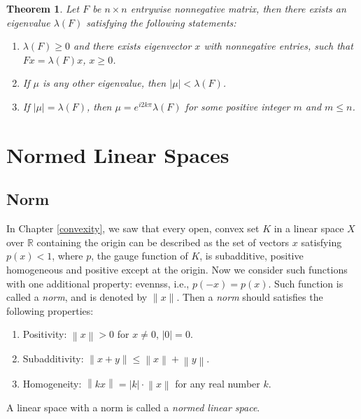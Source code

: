 \documentclass[11pt]{book}
\newtheorem{theorem}{Theorem}[chapter]
\theoremstyle{definition}
\numberwithin{equation}{chapter}
\begin{document}
\medskip

\begin{theorem}
Let $F$ be $n \times n$ entrywise nonnegative matrix, then there exists an eigenvalue $\lambda(F)$ satisfying the following statements:
\begin{enumerate}[label=(\alph*)]
    \item $\lambda(F) \geq 0$ and there exists eigenvector $x$ with nonnegative entries, such that $Fx = \lambda(F) x$, $x \geq 0$.
    
    \item If $\mu$ is any other eigenvalue, then $\left|\mu\right| < \lambda(F)$.
    
    \item If $\left|\mu\right| = \lambda(F)$, then $\mu = e^{i2k\pi} \lambda(F)$ for some positive integer $m$ and $m \leq n$.
\end{enumerate}
\end{theorem}



\chapter{Normed Linear Spaces}

\section{Norm}

In Chapter \ref{convexity}, we saw that every open, convex set $K$ in a linear space $X$ over $\mathbb{R}$ containing the origin can be described as the set of vectors $x$ satisfying $p(x) < 1$, where $p$, the gauge function of $K$, is subadditive, positive homogeneous and positive except at the origin. Now we consider such functions with one additional property: evennss, i.e., $p(-x) = p(x)$. Such function is called a {\em norm}, and is denoted by $\|x\|$. Then a {\em norm} should satisfies the following properties:
\begin{enumerate}[label=(\roman*)]
    \item Positivity: $\left\|x\right\| > 0$ for $x \neq 0$, $\left|0\right| = 0$.
    
    \item Subadditivity: $\left\|x+y\right\| \leq \left\|x\right\| + \left\|y\right\|$.
    
    \item Homogeneity: $\left\|kx\right\| = |k| \cdot \left\|x\right\|$ for any real number $k$.
\end{enumerate}
A linear space with a norm is called a {\em normed linear space}.
\end{document}
